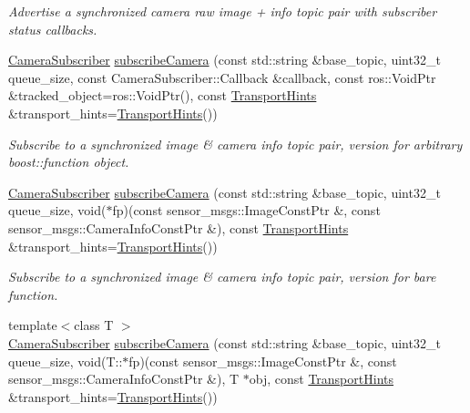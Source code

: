\begin{DoxyCompactItemize}
\begin{DoxyCompactList}\small\item\em Advertise a synchronized camera raw image + info topic pair with subscriber status callbacks. \end{DoxyCompactList}\item 
\hyperlink{classimage__transport_1_1_camera_subscriber}{Camera\-Subscriber} \hyperlink{classimage__transport_1_1_image_transport_a6754562b0ffe99b0cf716e621d2cfa6b}{subscribe\-Camera} (const std\-::string \&base\-\_\-topic, uint32\-\_\-t queue\-\_\-size, const Camera\-Subscriber\-::\-Callback \&callback, const ros\-::\-Void\-Ptr \&tracked\-\_\-object=ros\-::\-Void\-Ptr(), const \hyperlink{classimage__transport_1_1_transport_hints}{Transport\-Hints} \&transport\-\_\-hints=\hyperlink{classimage__transport_1_1_transport_hints}{Transport\-Hints}())
\begin{DoxyCompactList}\small\item\em Subscribe to a synchronized image \& camera info topic pair, version for arbitrary boost\-::function object. \end{DoxyCompactList}\item 
\hypertarget{classimage__transport_1_1_image_transport_a72b710072f3910086edb81e9363d0483}{\hyperlink{classimage__transport_1_1_camera_subscriber}{Camera\-Subscriber} \hyperlink{classimage__transport_1_1_image_transport_a72b710072f3910086edb81e9363d0483}{subscribe\-Camera} (const std\-::string \&base\-\_\-topic, uint32\-\_\-t queue\-\_\-size, void($\ast$fp)(const sensor\-\_\-msgs\-::\-Image\-Const\-Ptr \&, const sensor\-\_\-msgs\-::\-Camera\-Info\-Const\-Ptr \&), const \hyperlink{classimage__transport_1_1_transport_hints}{Transport\-Hints} \&transport\-\_\-hints=\hyperlink{classimage__transport_1_1_transport_hints}{Transport\-Hints}())}\label{classimage__transport_1_1_image_transport_a72b710072f3910086edb81e9363d0483}

\begin{DoxyCompactList}\small\item\em Subscribe to a synchronized image \& camera info topic pair, version for bare function. \end{DoxyCompactList}\item 
\hypertarget{classimage__transport_1_1_image_transport_a72d339fee7b99b4db0d2c5c01e259712}{{\footnotesize template$<$class T $>$ }\\\hyperlink{classimage__transport_1_1_camera_subscriber}{Camera\-Subscriber} \hyperlink{classimage__transport_1_1_image_transport_a72d339fee7b99b4db0d2c5c01e259712}{subscribe\-Camera} (const std\-::string \&base\-\_\-topic, uint32\-\_\-t queue\-\_\-size, void(T\-::$\ast$fp)(const sensor\-\_\-msgs\-::\-Image\-Const\-Ptr \&, const sensor\-\_\-msgs\-::\-Camera\-Info\-Const\-Ptr \&), T $\ast$obj, const \hyperlink{classimage__transport_1_1_transport_hints}{Transport\-Hints} \&transport\-\_\-hints=\hyperlink{classimage__transport_1_1_transport_hints}{Transport\-Hints}())}\label{classimage__transport_1_1_image_transport_a72d339fee7b99b4db0d2c5c01e259712}


\end{DoxyCompactItemize}
